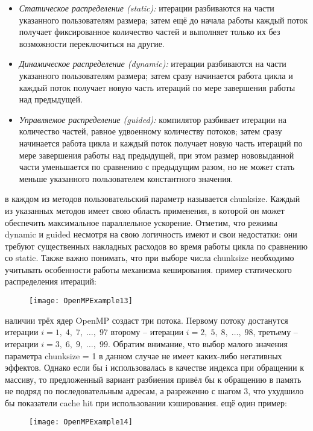 {\begin{itemize}
		\item\textit{Статическое распределение (static):} итерации разбиваются на части указанного пользователям размера; затем ещё до начала работы каждый поток получает фиксированное количество частей и выполняет только их без возможности переключиться на другие.
		\item\textit{Динамическое распределение (dynamic):} итерации разбиваются на части указанного пользователям размера; затем сразу начинается работа цикла и каждый поток получает новую часть итераций по мере завершения работы над предыдущей.
		\item\textit{Управляемое распределение (guided):} компилятор разбивает итерации на количество частей, равное удвоенному количеству потоков; затем сразу начинается работа цикла и каждый поток получает новую часть итераций по мере завершения работы над предыдущей, при этом размер нововыданной части уменьшается по сравнению с предыдущим разом, но не может стать меньше указанного пользователем константного значения.
	\end{itemize}
	 в каждом из методов пользовательский параметр называется chunk\textunderscore size. Каждый из указанных методов имеет свою область применения, в которой он может обеспечить максимальное параллельное ускорение. Отметим, что режимы dynamic и guided несмотря на свою логичность имеют и свои недостатки: они требуют существенных накладных расходов во время работы цикла по сравнению со static. Также важно понимать, что при выборе числа chunk\textunderscore size необходимо учитывать особенности работы механизма кеширования.
	 пример статического распределения итераций:
	\begin{figure}[H]
		\texttt{[image: OpenMPExample13]}
	\end{figure}
	 наличии трёх ядер OpenMP создаст три потока. Первому потоку достанутся итерации $i=1,\;4,\;7,\;…,\;97$ второму – итерации $i=2,\;5,\;8,\;…,\;98$, третьему – итерации $i=3,\;6,\;9,\;…,\;99$. Обратим внимание, что выбор малого значения параметра chunk\textunderscore size = 1 в данном случае не имеет каких-либо негативных эффектов. Однако если бы i использовалась в качестве индекса при обращении к массиву, то предложенный вариант разбиения привёл бы к обращению в память не подряд по последовательным адресам, а разреженно с шагом 3, что ухудшило бы показатели cache hit при использовании кэширования.
	 ещё один пример: 
	\begin{figure}[H]
		\texttt{[image: OpenMPExample14]}

\end{figure}}
